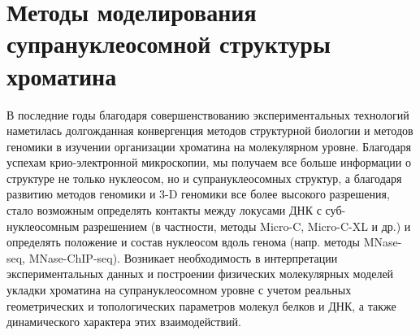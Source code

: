 \section{Методы моделирования супрануклеосомной структуры хроматина}

    В последние годы благодаря совершенствованию экспериментальных технологий наметилась долгожданная конвергенция методов структурной биологии и методов геномики в изучении организации хроматина на молекулярном уровне. Благодаря успехам крио-электронной микроскопии, мы получаем все больше информации о структуре не только нуклеосом, но и супрануклеосомных структур, а благодаря развитию методов геномики и 3-D геномики все более высокого разрешения, стало возможным определять контакты между локусами ДНК с суб-нуклеосомным разрешением (в частности, методы Micro-C, Micro-C-XL и др.) и определять положение и состав нуклеосом вдоль генома (напр. методы MNase-seq, MNase-ChIP-seq). Возникает необходимость в интерпретации экспериментальных данных и построении физических молекулярных моделей укладки хроматина на супрануклеосомном уровне с учетом реальных геометрических и топологических параметров молекул белков и ДНК, а также динамического характера этих взаимодействий.

